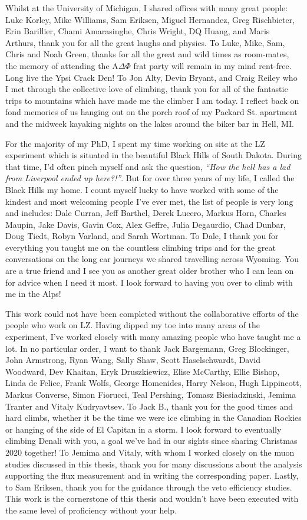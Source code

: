 \documentclass[a4paper,11pt,usegeometry]{scrreprt} %
\begin{document}
Whilst at the University of Michigan, I shared offices with many great people: Luke Korley, Mike Williams, Sam Eriksen, Miguel Hernandez, Greg Rischbieter, Erin Barillier, Chami Amarasinghe, Chris Wright, DQ Huang, and Maris Arthurs, thank you for all the great laughs and physics. To Luke, Mike, Sam, Chris and Noah Green, thanks for all the great and wild times as room-mates, the memory of attending the A$\Delta\Phi$ frat party will remain in my mind rent-free. Long live the Ypsi Crack Den! To Jon Alty, Devin Bryant, and Craig Reiley who I met through the collective love of climbing, thank you for all of the fantastic trips to mountains which have made me the climber I am today. I reflect back on fond memories of us hanging out on the porch roof of my Packard St. apartment and the midweek kayaking nights on the lakes around the biker bar in Hell, MI. 

For the majority of my PhD, I spent my time working on site at the LZ experiment which is situated in the beautiful Black Hills of South Dakota. During that time, I'd often pinch myself and ask the question, \textit{``How the hell has a lad from Liverpool ended up here?!''}. But for over three years of my life, I called the Black Hills my home. I count myself lucky to have worked with some of the kindest and most welcoming people I've ever met, the list of people is very long and includes: Dale Curran, Jeff Barthel, Derek Lucero, Markus Horn, Charles Maupin, Jake Davis, Gavin Cox, Alex Geffre, Julia Degaurdio, Chad Dunbar, Doug Tiedt, Robyn Varland, and Sarah Wortman. To Dale, I thank you for everything you taught me on the countless climbing trips and for the great conversations on the long car journeys we shared travelling across Wyoming. You are a true friend and I see you as another great older brother who I can lean on for advice when I need it most. I look forward to having you over to climb with me in the Alps!

This work could not have been completed without the collaborative efforts of the people who work on LZ. Having dipped my toe into many areas of the experiment, I've worked closely with many amazing people who have taught me a lot. In no particular order, I want to thank Jack Bargemann, Greg Blockinger, John Armstrong, Ryan Wang, Sally Shaw, Scott Haselschwardt, David Woodward, Dev Khaitan, Eryk Druszkiewicz, Elise McCarthy, Ellie Bishop, Linda de Felice, Frank Wolfs, George Homenides, Harry Nelson, Hugh Lippincott, Markus Converse, Simon Fiorucci, Teal Pershing, Tomasz Biesiadzinski, Jemima Tranter and Vitaly Kudryavtsev. To Jack B., thank you for the good times and hard climbs, whether it be the time we were ice climbing in the Canadian Rockies or hanging of the side of El Capitan in a storm. I look forward to eventually climbing Denali with you, a goal we've had in our sights since sharing Christmas 2020 together! To Jemima and Vitaly, with whom I worked closely on the muon studies discussed in this thesis, thank you for many discussions about the analysis supporting the flux measurement and in writing the corresponding paper. Lastly, to Sam Eriksen, thank you for the guidance through the veto efficiency studies. This work is the cornerstone of this thesis and wouldn't have been executed with the same level of proficiency without your help.
\end{document}
